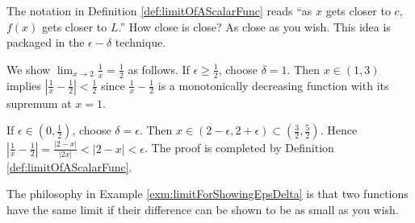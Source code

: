 \begin{rem}
  The notation in Definition \ref{def:limitOfAScalarFunc}
  reads ``as $x$ gets closer to $c$,
 $f(x)$ gets closer to $L$.''
How close is close?
As close as you wish.
This idea is packaged in the $\epsilon-\delta$ technique.
\end{rem}

\begin{exm}
  \label{exm:limitForShowingEpsDelta}
   We show $\lim_{x\rightarrow 2}\frac{1}{x}= \frac{1}{2}$ as follows.
   If $\epsilon\ge \frac{1}{2}$,
   choose $\delta=1$.
   Then $x\in(1,3)$ implies
   $\left|\frac{1}{x}-\frac{1}{2}\right|<\frac{1}{2}$
   since $\frac{1}{x}-\frac{1}{2}$
   is a monotonically decreasing function
   with its supremum at $x=1$.

  If $\epsilon\in (0,\frac{1}{2})$,
   choose $\delta=\epsilon$.
  Then $x\in (2-\epsilon,2+\epsilon)\subset
  (\frac{3}{2},\frac{5}{2})$.
  Hence
  $\left|\frac{1}{x}-\frac{1}{2}\right|=\frac{|2-x|}{|2x|}<|2-x|<\epsilon$.
  The proof is completed by Definition \ref{def:limitOfAScalarFunc}.
\end{exm}

\begin{rem}
  The philosophy in Example \ref{exm:limitForShowingEpsDelta}
  is that two functions have the same limit
  if their difference can be shown to be as small as you wish.
\end{rem}




